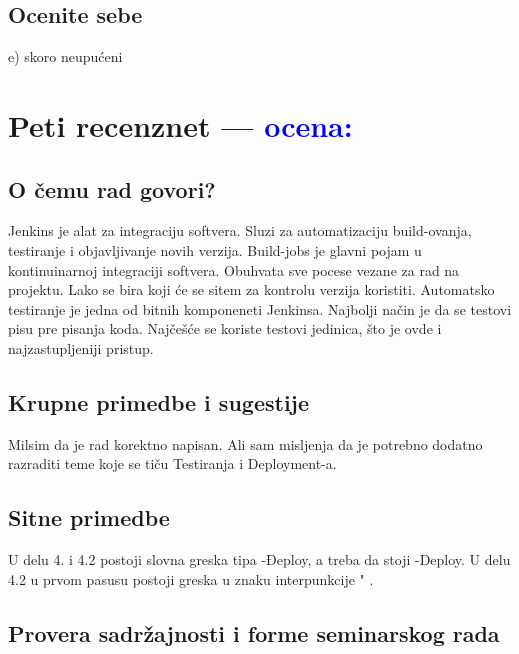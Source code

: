 \documentclass[a4paper]{report}
\newcommand{\odgovor}[1]{\textcolor{blue}{#1}}
\begin{document}
\section{Ocenite sebe}
 e) skoro neupućeni

\chapter{Peti recenznet \odgovor{--- ocena:}}
\section{O čemu rad govori?}
Jenkins je alat za integraciju softvera. Sluzi za automatizaciju build-ovanja, testiranje i objavljivanje novih verzija. Build-jobs je glavni pojam u kontinuinarnoj integraciji softvera. Obuhvata sve pocese vezane za rad na projektu. Lako se bira koji će se sitem za kontrolu verzija koristiti. Automatsko testiranje je jedna od bitnih komponeneti Jenkinsa. Najbolji način je da se testovi pisu pre pisanja koda. Najčešće se koriste testovi jedinica, što je ovde i najzastupljeniji pristup.  

\section{Krupne primedbe i sugestije}
Milsim da je rad korektno napisan. Ali sam misljenja da je potrebno dodatno razraditi teme koje se tiču Testiranja i Deployment-a.  

\section{Sitne primedbe}
U delu 4. i 4.2 postoji slovna greska tipa -Đeploy, a treba da stoji -Deploy. U delu 4.2 u prvom pasusu postoji greska u znaku interpunkcije " .


\section{Provera sadržajnosti i forme seminarskog rada}
\end{document}
